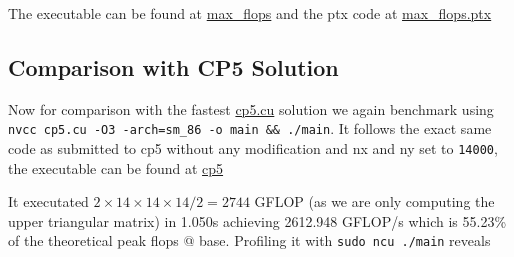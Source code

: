 The executable can be found at \url{max_flops} and the ptx code at
\url{max_flops.ptx}

\hypertarget{comparison-with-cp5-solution}{%
\subsection{Comparison with CP5
Solution}\label{comparison-with-cp5-solution}}

Now for comparison with the fastest \url{cp5.cu} solution we again
benchmark using
\texttt{nvcc\ cp5.cu\ -O3\ -arch=sm\_86\ -o\ main\ \&\&\ ./main}. It
follows the exact same code as submitted to cp5 without any modification
and nx and ny set to \texttt{14000}, the executable can be found at
\url{cp5}

\begin{Shaded}
\begin{Highlighting}[]
\OperatorTok{:} \OperatorTok{(}\OperatorTok{)}
\OperatorTok{:} 
\OperatorTok{:} \OperatorTok{/}
\end{Highlighting}
\end{Shaded}

It executated \(2\times 14\times 14\times 14 / 2= 2744\) GFLOP (as we
are only computing the upper triangular matrix) in 1.050s achieving
2612.948 GFLOP/s which is 55.23\% of the theoretical peak flops @ base.
Profiling it with \texttt{sudo\ ncu\ ./main} reveals

